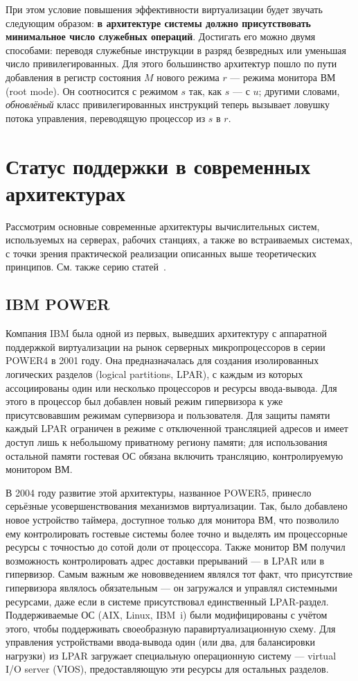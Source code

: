При этом условие повышения эффективности виртуализации будет звучать следующим образом: \textbf{в архитектуре системы должно присутствовать минимальное число служебных операций}. Достигать его можно двумя способами: переводя служебные инструкции в разряд безвредных или уменьшая число привилегированных. Для этого большинство архитектур пошло по пути добавления в регистр состояния $M$ нового режима $r$ --- режима монитора ВМ (\abbr root mode). Он соотносится с режимом $s$ так, как $s$ --- с $u$; другими словами, \emph{обновлёный} класс привилегированных инструкций теперь вызывает ловушку потока управления, переводящую процессор из $s$ в $r$.

\section{Статус поддержки в современных архитектурах}

Рассмотрим основные современные архитектуры вычислительных систем, используемых на серверах, рабочих станциях, а также во встраиваемых системах, с точки зрения практической реализации описанных выше теоретических принципов. См. также серию статей~\cite{mpr-03-05-07-01,mpr-03-12-07-01,mpr-03-26-07-01}.

\subsection{IBM POWER}

Компания IBM была одной из первых, выведших архитектуру с аппаратной поддержкой виртуализации на рынок серверных микропроцессоров в серии POWER4 в 2001 году. Она предназначалась для создания изолированных логических разделов (\abbr logical partitions, LPAR), с каждым из которых ассоциированы один или несколько процессоров и ресурсы ввода-вывода. Для этого в процессор был добавлен новый режим гипервизора к уже присутсвовавшим режимам супервизора и пользователя. Для защиты памяти каждый LPAR ограничен в режиме с отключенной трансляцией адресов и имеет доступ лишь к небольшому приватному региону памяти; для использования остальной памяти гостевая ОС обязана включить трансляцию, контролируемую монитором ВМ.

В 2004 году развитие этой архитектуры, названное POWER5, принесло серьёзные усовершенствования механизмов виртуализации. Так, было добавлено новое устройство таймера, доступное только для монитора ВМ, что позволило ему контролировать гостевые системы более точно и выделять им процессорные ресурсы с точностью до сотой доли от процессора. Также монитор ВМ получил возможность контролировать адрес доставки прерываний --- в LPAR или в гипервизор. Самым важным же нововведением являлся тот факт, что присутствие гипервизора являлось обязательным --- он загружался и управлял системными ресурсами, даже если в системе присутствовал единственный LPAR-раздел. Поддерживаемые ОС (AIX, Linux, IBM~i) были модифицированы с учётом этого, чтобы поддерживать своеобразную паравиртуализационную схему. Для управления устройствами ввода-вывода один (или два, для балансировки нагрузки) из LPAR загружает специальную операционную систему --- virtual I/O server (VIOS), предоставляющую эти ресурсы для остальных разделов.

